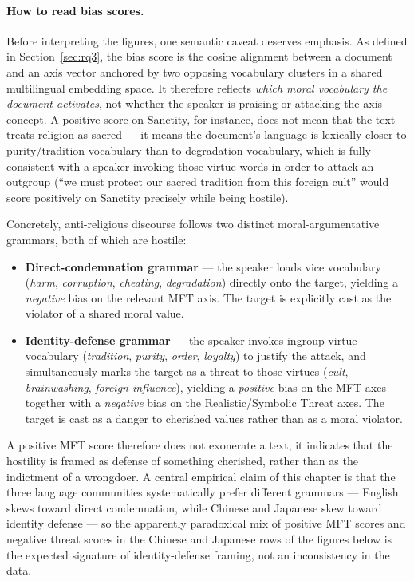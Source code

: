 \documentclass[../CLthesis.tex]{subfiles}
\begin{document}
\paragraph{How to read bias scores.}
Before interpreting the figures, one semantic caveat deserves emphasis. As defined in Section~\ref{sec:rq3}, the bias score is the cosine alignment between a document and an axis vector anchored by two opposing vocabulary clusters in a shared multilingual embedding space. It therefore reflects \emph{which moral vocabulary the document activates}, not whether the speaker is praising or attacking the axis concept. A positive score on Sanctity, for instance, does not mean that the text treats religion as sacred — it means the document's language is lexically closer to purity/tradition vocabulary than to degradation vocabulary, which is fully consistent with a speaker invoking those virtue words in order to attack an outgroup (``we must protect our sacred tradition from this foreign cult'' would score positively on Sanctity precisely while being hostile).

Concretely, anti-religious discourse follows two distinct moral-argumentative grammars, both of which are hostile:
\begin{itemize}
    \item \textbf{Direct-condemnation grammar} — the speaker loads vice vocabulary (\textit{harm}, \textit{corruption}, \textit{cheating}, \textit{degradation}) directly onto the target, yielding a \emph{negative} bias on the relevant MFT axis. The target is explicitly cast as the violator of a shared moral value.
    \item \textbf{Identity-defense grammar} — the speaker invokes ingroup virtue vocabulary (\textit{tradition}, \textit{purity}, \textit{order}, \textit{loyalty}) to justify the attack, and simultaneously marks the target as a threat to those virtues (\textit{cult}, \textit{brainwashing}, \textit{foreign influence}), yielding a \emph{positive} bias on the MFT axes together with a \emph{negative} bias on the Realistic/Symbolic Threat axes. The target is cast as a danger to cherished values rather than as a moral violator.
\end{itemize}
A positive MFT score therefore does not exonerate a text; it indicates that the hostility is framed as defense of something cherished, rather than as the indictment of a wrongdoer. A central empirical claim of this chapter is that the three language communities systematically prefer different grammars — English skews toward direct condemnation, while Chinese and Japanese skew toward identity defense — so the apparently paradoxical mix of positive MFT scores and negative threat scores in the Chinese and Japanese rows of the figures below is the expected signature of identity-defense framing, not an inconsistency in the data.
\end{document}
